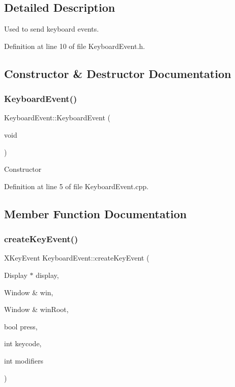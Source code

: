 \subsection{Detailed Description}
Used to send keyboard events. 

Definition at line 10 of file Keyboard\+Event.\+h.



\subsection{Constructor \& Destructor Documentation}
\mbox{\label{class_ubuntu_controller_1_1_keyboard_event_a5a4efca276ce847a471b228c4a114bc7}} 
\subsubsection{\texorpdfstring{Keyboard\+Event()}{KeyboardEvent()}}
{\footnotesize\ttfamily Keyboard\+Event\+::\+Keyboard\+Event (\begin{DoxyParamCaption}\item[{void}]{ }\end{DoxyParamCaption})}

Constructor 

Definition at line 5 of file Keyboard\+Event.\+cpp.



\subsection{Member Function Documentation}
\mbox{\label{class_ubuntu_controller_1_1_keyboard_event_a84e25f7a086a015007fe877a55d9444e}} 
\subsubsection{\texorpdfstring{create\+Key\+Event()}{createKeyEvent()}}
{\footnotesize\ttfamily X\+Key\+Event Keyboard\+Event\+::create\+Key\+Event (\begin{DoxyParamCaption}\item[{Display $\ast$}]{display,  }\item[{Window \&}]{win,  }\item[{Window \&}]{win\+Root,  }\item[{bool}]{press,  }\item[{int}]{keycode,  }\item[{int}]{modifiers }\end{DoxyParamCaption})}

